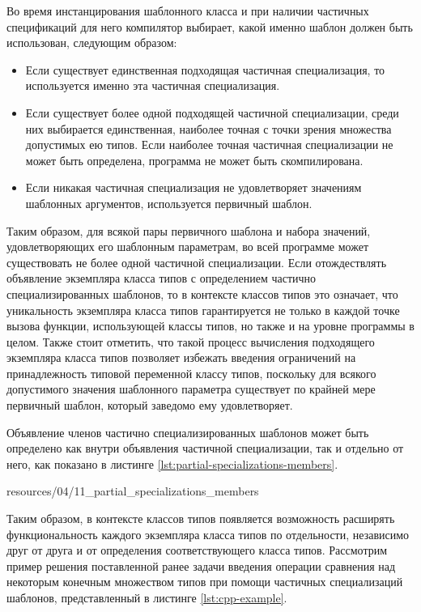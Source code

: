Во время инстанцирования шаблонного класса и при наличии частичных спецификаций для него компилятор выбирает, какой именно шаблон должен быть использован, следующим образом:
\begin{itemize}
    \item Если существует единственная подходящая частичная специализация, то используется именно эта частичная специализация.
    \item Если существует более одной подходящей частичной специализации, среди них выбирается единственная, наиболее точная с точки зрения множества допустимых ею типов. Если наиболее точная частичная специализации не может быть определена, программа не может быть скомпилирована.    
    \item Если никакая частичная специализация не удовлетворяет значениям шаблонных аргументов, используется первичный шаблон.
\end{itemize}
Таким образом, для всякой пары первичного шаблона и набора значений, удовлетворяющих его шаблонным параметрам, во всей программе может существовать не более одной частичной специализации. Если отождествлять объявление экземпляра класса типов с определением частично специализированных шаблонов, то в контексте классов типов это означает, что уникальность экземпляра класса типов гарантируется не только в каждой точке вызова функции, использующей классы типов, но также и на уровне программы в целом. Также стоит отметить, что такой процесс вычисления подходящего экземпляра класса типов позволяет избежать введения ограничений на принадлежность типовой переменной классу типов, поскольку для всякого допустимого значения шаблонного параметра существует по крайней мере первичный шаблон, который заведомо ему удовлетворяет. 

Объявление членов частично специализированных шаблонов может быть определено как внутри объявления частичной специализации, так и отдельно от него, как показано в листинге \ref{lst:partial-specializations-members}. 


{resources/04/11_partial_specializations_members}

 Таким образом, в контексте классов типов появляется возможность расширять функциональность каждого экземпляра класса типов по отдельности, независимо друг от друга и от определения соответствующего класса типов. Рассмотрим пример решения поставленной ранее задачи введения операции сравнения над некоторым конечным множеством типов при помощи частичных специализаций шаблонов, представленный в листинге \ref{lst:cpp-example}.
 
